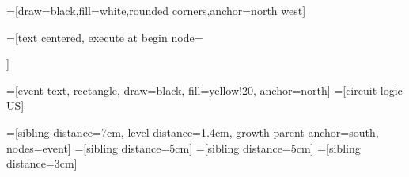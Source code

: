 \DeclareMathOperator{\doo}{d}
\DeclareMathOperator{\nibefore}{\lhd}
\DeclareMathOperator{\simultaneous}{\triangle}
\DeclareMathOperator{\ibefore}{\unlhd}
\DeclareMathOperator{\inter}{\cap}
\DeclareMathOperator{\union}{\cup}
\DeclareMathOperator{\tvar}{\mathsf{tvar}}
\DeclareMathOperator{\distinct}{\mathsf{distinct}}
\DeclareMathOperator{\set}{\mathsf{set}}
\DeclareMathOperator{\xbefore}{\rightarrow}
\DeclareMathOperator{\listt}{\mathsf{list}}
\DeclareMathOperator{\sett}{\mathsf{set}}
\DeclareMathOperator{\tformulat}{\mathsf{tformula}}
\DeclareMathOperator{\BasicEventMinLevel}{\mathsf{BasicEventMinLevel}}
\DeclareMathOperator{\RootProbability}{\mathsf{RootProbability}}
\DeclareMathOperator{\evaluateRule}{\mathsf{evaluateRule}}
\DeclareMathOperator{\minBasicEventLevel}{\mathsf{minBasicEventLevel}}
\DeclareMathOperator{\ftProbability}{\mathsf{ftProbability}}
\DeclareMathOperator{\defs}{\doteq}
\DeclareMathOperator{\concat}{@}
\newcommand{\aaexp}[2]{{\left[#1\right]}^{\left[#2\right]}}
\newcommand{\nominalvalue}[2]{\mathsf{N}^{#2}\left(#1\right)}
\newcommand{\failurevalue}[2]{\mathsf{#1}^{#2}}
\newcommand{\component}[1]{\mathsf{C}^{#1}}
\newcommand{\outvalue}[2]{\mathsf{#1}^{#2}}
\newcommand{\outvalueof}[1]{\rho\left(#1\right)}
\def\fba{fba}
\def\tfa{tfa}

\newcommand{\includeautosizegraphics}[1]{%
\texttt{[image: \#1]}%
}

\def\tikzoverlay{%
   \tikz[baseline,overlay]\node[every overlay node]
}

=[draw=black,fill=white,rounded corners,anchor=north west]

=[text centered, 
  execute at begin node={\begin{varwidth}{2cm}},
  execute at end node={\end{varwidth}}
  ]
  
=[event text, rectangle, draw=black, fill=yellow!20, anchor=north]
=[circuit logic US]

=[sibling distance=7cm, level distance=1.4cm, growth parent anchor=south, nodes=event]
=[sibling distance=5cm]
=[sibling distance=5cm]
=[sibling distance=3cm]


